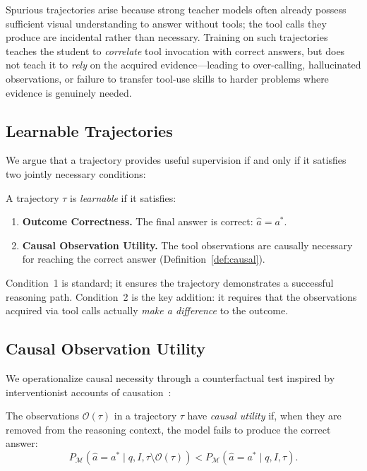 Spurious trajectories arise because strong teacher models often already possess sufficient visual understanding to answer without tools; the tool calls they produce are incidental rather than necessary.
Training on such trajectories teaches the student to \emph{correlate} tool invocation with correct answers, but does not teach it to \emph{rely} on the acquired evidence—leading to over-calling, hallucinated observations, or failure to transfer tool-use skills to harder problems where evidence is genuinely needed.

\subsection{Learnable Trajectories}

We argue that a trajectory provides useful supervision if and only if it satisfies two jointly necessary conditions:

\begin{definition}
\label{def:learnable}
A trajectory $\tau$ is \emph{learnable} if it satisfies:
\begin{enumerate}[leftmargin=*, itemsep=2pt]
    \item \textbf{Outcome Correctness.} The final answer is correct: $\hat{a} = a^*$.
    \item \textbf{Causal Observation Utility.} The tool observations are causally necessary for reaching the correct answer (Definition~\ref{def:causal}).
\end{enumerate}
\end{definition}

Condition~1 is standard; it ensures the trajectory demonstrates a successful reasoning path.
Condition~2 is the key addition: it requires that the observations acquired via tool calls actually \emph{make a difference} to the outcome.

\subsection{Causal Observation Utility}

We operationalize causal necessity through a counterfactual test inspired by interventionist accounts of causation~\citep{pearl2009causality}:

\begin{definition}
\label{def:causal}
The observations $\mathcal{O}(\tau)$ in a trajectory $\tau$ have \emph{causal utility} if, when they are removed from the reasoning context, the model fails to produce the correct answer:
\begin{equation}
    P_{\mathcal{M}}(\hat{a} = a^* \mid q, I, \tau \setminus \mathcal{O}(\tau)) < P_{\mathcal{M}}(\hat{a} = a^* \mid q, I, \tau).
\end{equation}
\end{definition}

